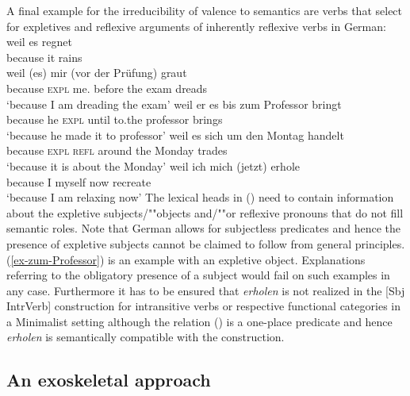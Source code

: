 \begin{exe}
\begin{xlist}[iv.]
\begin{exe}
\begin{xlist}[iv.]
A final example for the irreducibility of valence to semantics are verbs that select for expletives
and reflexive arguments of inherently reflexive verbs in German:
\eal
\ex 
\gll weil es regnet\\
     because it rains\\
\ex 
\gll weil (es) mir (vor der Prüfung) graut\\
     because \textsc{expl} me.\dat{} before the exam dreads\\
\glt `because I am dreading the exam'
\ex\label{ex-zum-Professor}
\gll weil er es bis zum Professor bringt\\
     because he \textsc{expl} until to.the professor brings\\
\glt `because he made it to professor'
\ex 
\gll weil es sich um den Montag handelt\\
     because \textsc{expl} \textsc{refl} around the Monday trades\\
\glt `because it is about the Monday'
\ex 
\gll weil ich mich (jetzt) erhole\\
     because I myself now recreate\\
\glt `because I am relaxing now'
\zl
The lexical heads in () need to contain information about the expletive subjects/""objects and/""or
reflexive pronouns that do not fill semantic roles. Note that German allows for subjectless
predicates and hence the presence of expletive subjects cannot be claimed to follow from general
principles. (\ref{ex-zum-Professor}) is an example with an expletive object. Explanations referring
to the obligatory presence of a subject would fail on such examples in any case. Furthermore it has
to be ensured that \emph{erholen} is not realized in the [Sbj IntrVerb] construction for
intransitive verbs or respective functional categories in a Minimalist setting although the relation
 () is a one-place predicate and hence \emph{erholen} is
semantically compatible with the construction.  



\subsection{An exoskeletal approach}
\label{Abschnitt-Diskussion-Haugereid}


\end{xlist}
\end{exe}
\end{xlist}
\end{exe}
